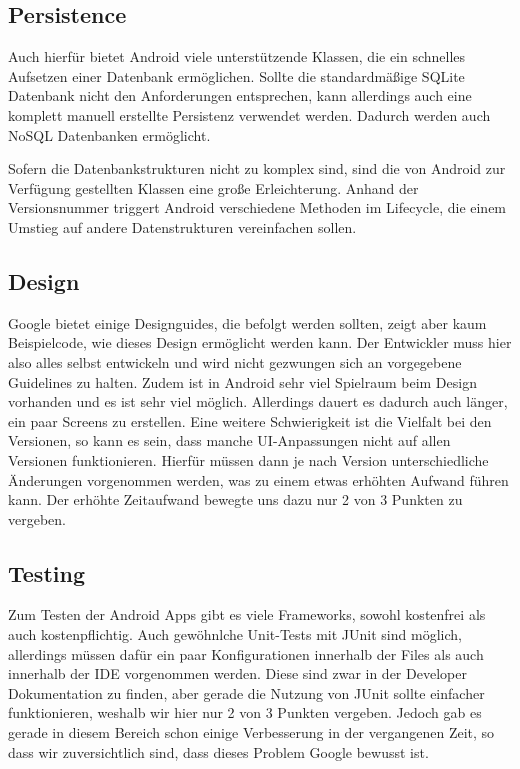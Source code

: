 \subsection{Persistence}
Auch hierfür bietet Android viele unterstützende Klassen, die ein schnelles Aufsetzen einer Datenbank ermöglichen. Sollte die standardmäßige SQLite Datenbank nicht den Anforderungen entsprechen, kann allerdings auch eine komplett manuell erstellte Persistenz verwendet werden. Dadurch werden auch NoSQL Datenbanken ermöglicht.

Sofern die Datenbankstrukturen nicht zu komplex sind, sind die von Android zur Verfügung gestellten Klassen eine große Erleichterung. Anhand der Versionsnummer triggert Android verschiedene Methoden im Lifecycle, die einem Umstieg auf andere Datenstrukturen vereinfachen sollen.

\subsection{Design}
Google bietet einige Designguides, die befolgt werden sollten, zeigt aber kaum Beispielcode, wie dieses Design ermöglicht werden kann. Der Entwickler muss hier also alles selbst entwickeln und wird nicht gezwungen sich an vorgegebene Guidelines zu halten. Zudem ist in Android sehr viel Spielraum beim Design vorhanden und es ist sehr viel möglich. Allerdings dauert es dadurch auch länger, ein paar Screens zu erstellen. Eine weitere Schwierigkeit ist die Vielfalt bei den Versionen, so kann es sein, dass manche UI-Anpassungen nicht auf allen Versionen funktionieren. Hierfür müssen dann je nach Version unterschiedliche Änderungen vorgenommen werden, was zu einem etwas erhöhten Aufwand führen kann. Der erhöhte Zeitaufwand bewegte uns dazu nur 2 von 3 Punkten zu vergeben.

\subsection{Testing}
Zum Testen der Android Apps gibt es viele Frameworks, sowohl kostenfrei als auch kostenpflichtig. Auch gewöhnlche Unit-Tests mit JUnit sind möglich, allerdings müssen dafür ein paar Konfigurationen innerhalb der Files als auch innerhalb der IDE vorgenommen werden. Diese sind zwar in der Developer Dokumentation zu finden, aber gerade die Nutzung von JUnit sollte einfacher funktionieren, weshalb wir hier nur 2 von 3 Punkten vergeben. Jedoch gab es gerade in diesem Bereich schon einige Verbesserung in der vergangenen Zeit, so dass wir zuversichtlich sind, dass dieses Problem Google bewusst ist.

